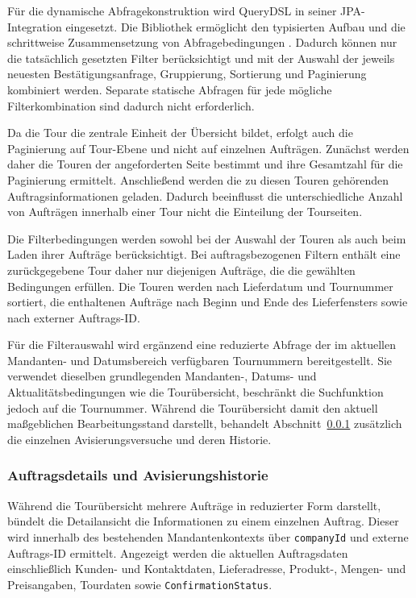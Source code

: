 Für die dynamische Abfragekonstruktion wird QueryDSL in seiner JPA-Integration
eingesetzt. Die Bibliothek ermöglicht den typisierten Aufbau und die
schrittweise Zusammensetzung von Abfragebedingungen
\parencite{querydslUnifiedQueries}. Dadurch können nur die tatsächlich gesetzten
Filter berücksichtigt und mit der Auswahl der jeweils neuesten
Bestätigungsanfrage, Gruppierung, Sortierung und Paginierung kombiniert
werden. Separate statische Abfragen für jede mögliche Filterkombination sind
dadurch nicht erforderlich.

Da die Tour die zentrale Einheit der Übersicht bildet, erfolgt auch die
Paginierung auf Tour-Ebene und nicht auf einzelnen Aufträgen. Zunächst werden
daher die Touren der angeforderten Seite bestimmt und ihre Gesamtzahl für die
Paginierung ermittelt. Anschließend werden die zu diesen Touren gehörenden
Auftragsinformationen geladen. Dadurch beeinflusst die unterschiedliche Anzahl
von Aufträgen innerhalb einer Tour nicht die Einteilung der Tourseiten.

Die Filterbedingungen werden sowohl bei der Auswahl der Touren als auch beim
Laden ihrer Aufträge berücksichtigt. Bei auftragsbezogenen Filtern enthält eine
zurückgegebene Tour daher nur diejenigen Aufträge, die die gewählten
Bedingungen erfüllen. Die Touren werden nach Lieferdatum und Tournummer
sortiert, die enthaltenen Aufträge nach Beginn und Ende des Lieferfensters
sowie nach externer Auftrags-ID.

Für die Filterauswahl wird ergänzend eine reduzierte Abfrage der im aktuellen
Mandanten- und Datumsbereich verfügbaren Tournummern bereitgestellt. Sie
verwendet dieselben grundlegenden Mandanten-, Datums- und
Aktualitätsbedingungen wie die Tourübersicht, beschränkt die Suchfunktion
jedoch auf die Tournummer. Während die Tourübersicht damit den aktuell
maßgeblichen Bearbeitungsstand darstellt, behandelt
Abschnitt~\ref{sec:auftragsdetails-avisierungshistorie} zusätzlich die
einzelnen Avisierungsversuche und deren Historie.

\subsubsection{Auftragsdetails und Avisierungshistorie}
\label{sec:auftragsdetails-avisierungshistorie}

Während die Tourübersicht mehrere Aufträge in reduzierter Form darstellt,
bündelt die Detailansicht die Informationen zu einem einzelnen Auftrag. Dieser
wird innerhalb des bestehenden Mandantenkontexts über \texttt{companyId} und
externe Auftrags-ID ermittelt. Angezeigt werden die aktuellen Auftragsdaten
einschließlich Kunden- und Kontaktdaten, Lieferadresse, Produkt-, Mengen- und
Preisangaben, Tourdaten sowie \texttt{ConfirmationStatus}.

